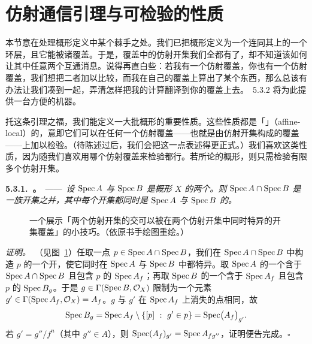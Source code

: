 
\section{仿射通信引理与可\trAffineLocal{}检验的性质}

本节意在处理概形定义中某个棘手之处。我们已把概形定义为一个\trTopologicalSpace{}连同其上的一个环层，且它能被诸\trAffineScheme{}覆盖。于是，覆盖中的仿射开集我们全都有了，却不知道该如何让其中任意两个互通消息。说得再直白些：若我有一个仿射覆盖，你也有一个仿射覆盖，我们想把二者加以比较，而我在自己的覆盖上算出了某个东西，那么总该有办法让我们凑到一起，弄清怎样把我的计算翻译到你的覆盖上去。\trAffineCommunicationLemma{}~5.3.2 将为此提供一台方便的机器。

托这条引理之福，我们能定义一大批概形的重要性质。这些性质都是「\trAffineLocal{}」（affine-local）的，意即它们可以在任何一个仿射覆盖——也就是由仿射开集构成的覆盖——上加以检验。（待\trAffineCommunicationLemma{}陈述过后，我们会把这一点表述得更正式。）我们喜欢这类性质，因为随我们喜欢用哪个仿射覆盖来检验都行。若所论的概形\trQuasicompact，则只需检验有限多个仿射开集。

\textbf{5.3.1.\ \trhProposition{}。}\ ——\ \emph{设 $\operatorname{Spec} A$ 与 $\operatorname{Spec} B$ 是概形 $X$ 的两个\trAffine\trOpenSubscheme。则 $\operatorname{Spec} A\cap\operatorname{Spec} B$ 是一族开集之并，其中每个开集都同时是 $\operatorname{Spec} A$ 与 $\operatorname{Spec} B$ 的\trDistinguishedOpen\trSubscheme{}。}

\begin{figure}[htbp]
  \centering
  \caption{一个展示「两个仿射开集的交可以被在两个仿射开集中同时特异的开集覆盖」的小技巧。（依原书手绘图重绘。）}\label{fig:affine-communication-trick}
\end{figure}

\emph{证明。}\ （见图~\ref{fig:affine-communication-trick}）任取一点 $p\in\operatorname{Spec} A\cap\operatorname{Spec} B$，我们在 $\operatorname{Spec} A\cap\operatorname{Spec} B$ 中构造 $p$ 的一个开\trNeighborhood，使它同时在 $\operatorname{Spec} A$ 与 $\operatorname{Spec} B$ 中都特异。取 $\operatorname{Spec} A$ 的一个含于 $\operatorname{Spec} A\cap\operatorname{Spec} B$ 且包含 $p$ 的\trDistinguishedOpen{} $\operatorname{Spec} A_f$；再取 $\operatorname{Spec} B$ 的一个含于 $\operatorname{Spec} A_f$ 且包含 $p$ 的\trDistinguishedOpen{} $\operatorname{Spec} B_g$。于是 $g\in\Gamma(\operatorname{Spec} B,\mathcal{O}_X)$ 限制为一个元素 $g'\in\Gamma(\operatorname{Spec} A_f,\mathcal{O}_X)=A_f$。$g$ 与 $g'$ 在 $\operatorname{Spec} A_f$ 上消失的点相同，故
\[
\operatorname{Spec} B_g=\operatorname{Spec} A_f\setminus\{[p]\ :\ g'\in p\}=\operatorname{Spec}\bigl(A_f\bigr)_{g'}.
\]
若 $g'=g''/f^n$（其中 $g''\in A$），则 $\operatorname{Spec}(A_f)_{g'}=\operatorname{Spec} A_{fg''}$，证明便告完成。\hfill$\square$


